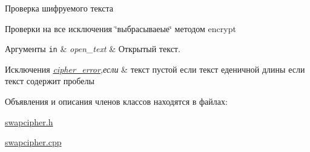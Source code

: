 Проверка шифруемого текста 

Проверки на все исключения \char`\"{}выбрасываеые\char`\"{} методом encrypt 
\begin{DoxyParams}[1]{Аргументы}
\mbox{\tt in}  & {\em open\+\_\+text} & Открытый текст. \\
\hline
\end{DoxyParams}

\begin{DoxyExceptions}{Исключения}
{\em \hyperlink{classcipher__error}{cipher\+\_\+error},если} & текст пустой если текст еденичной длины если текст содержит пробелы \\
\hline
\end{DoxyExceptions}


Объявления и описания членов классов находятся в файлах\+:\begin{DoxyCompactItemize}
\item 
\hyperlink{swapcipher_8h}{swapcipher.\+h}\item 
\hyperlink{swapcipher_8cpp}{swapcipher.\+cpp}\end{DoxyCompactItemize}
